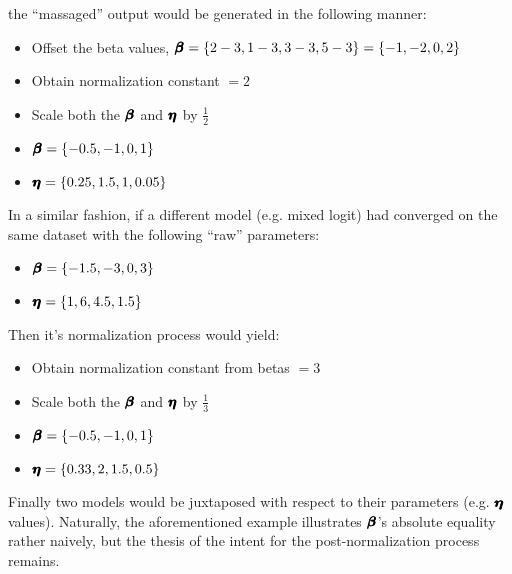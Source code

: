 \documentclass[12pt,a4paper]{article}
\begin{document}
the ``massaged'' output would be generated in the following manner:

\begin{itemize}
\item Offset the beta values, \(\pmb{\hm{\beta}} = \{2-3, 1-3, 3-3, 5-3\} = \{-1, -2, 0, 2\}\)
\item Obtain normalization constant \(=2\)
\item Scale both the \( \pmb{\hm{\beta}} \) and \( \pmb{\hm{\eta}} \) by \(\frac{1}{2}\)
\item \(\pmb{\hm{\beta}} = \{-0.5, -1, 0, 1\}\)
\item \(\pmb{\hm{\eta}} = \{0.25, 1.5, 1, 0.05\}\)
\end{itemize}

In a similar fashion, if a different model (e.g. mixed logit) had converged on the same dataset with the following ``raw'' parameters:

\begin{itemize}
\item \(\pmb{\hm{\beta}} = \{-1.5, -3, 0, 3\}\)
\item \(\pmb{\hm{\eta}} = \{1, 6, 4.5, 1.5\}\)
\end{itemize}

Then it's normalization process would yield:
\begin{itemize}
\item Obtain normalization constant from betas \(=3\)
\item Scale both the \( \pmb{\hm{\beta}} \) and \( \pmb{\hm{\eta}} \) by \(\frac{1}{3}\)
\item \(\pmb{\hm{\beta}} = \{-0.5, -1, 0, 1\}\)
\item \(\pmb{\hm{\eta}} = \{0.33, 2, 1.5, 0.5\}\)
\end{itemize}

Finally two models would be juxtaposed with respect to their parameters (e.g. \(\pmb{\hm{\eta}}\) values). Naturally, the aforementioned example illustrates \(\pmb{\hm{\beta}}\)'s absolute equality rather naively, but the thesis of the intent for the post-normalization process remains. 
\end{document}

